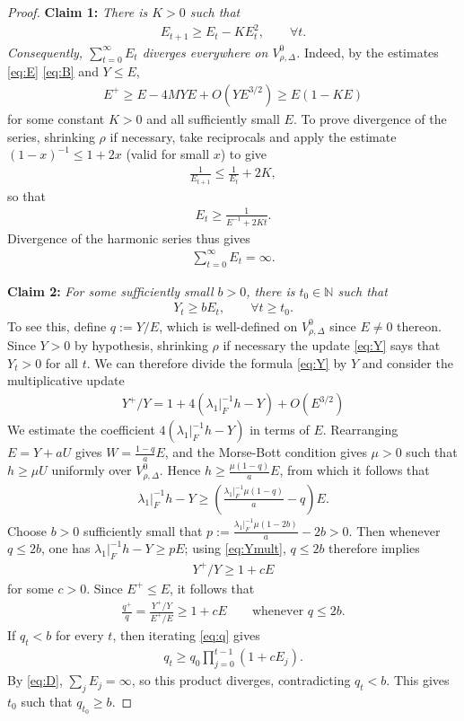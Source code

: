 \documentclass{article}
\newcommand{\NB}{\mathbb{N}}
\theoremstyle{plain}
\theoremstyle{definition}
\theoremstyle{remark}
\begin{document}
\begin{proof}
\noindent\textbf{Claim 1:} \emph{There is $K>0$ such that
\begin{align}
E_{t+1}\ge E_t-KE_t^2,\qquad\forall t.
\end{align}
Consequently, $\sum_{t=0}^{\infty}E_t$ diverges everywhere on $V^0_{\rho,\Delta}$.}
Indeed, by the estimates \eqref{eq:E} \eqref{eq:B} and $Y\le E$,
\begin{align}
E^+\geq E -4MYE+O(YE^{3/2})\geq E(1-KE)
\end{align}
for some constant $K>0$ and all sufficiently small $E$. To prove divergence of the series, shrinking $\rho$ if necessary, take reciprocals and apply the estimate $(1-x)^{-1}\leq 1+2x$ (valid for small $x$) to give
\begin{align}
\frac{1}{E_{t+1}}\leq
\frac{1}{E_t}+2K,
\end{align}
so that
\begin{align}
E_t\ge \frac{1}{E^{-1}+2Kt}.
\end{align}
Divergence of the harmonic series thus gives
\begin{align}\label{eq:D}
\sum_{t=0}^{\infty}E_t=\infty.
\end{align}

\noindent\textbf{Claim 2:}\emph{ For some sufficiently small $b>0$, there is $t_0\in\NB$ such that
\begin{align}
Y_t\ge bE_t,\qquad \forall t\ge t_0.
\end{align}}
To see this, define $q:=Y/E$, which is well-defined on $V^0_{\rho,\Delta}$ since $E\neq 0$ thereon. Since $Y> 0$ by hypothesis, shrinking $\rho$ if necessary the update \eqref{eq:Y} says that $Y_t> 0$ for all $t$. We can therefore divide the formula \eqref{eq:Y} by $Y$ and consider the multiplicative update
\begin{align}\label{eq:Ymult}
Y^+/Y = 1+4(\lambda_1|_F^{-1} h-Y) + O(E^{3/2})
\end{align}
We estimate the coefficient $4(\lambda_1|_F^{-1} h-Y)$ in terms of $E$. Rearranging $E=Y+aU$ gives $W=\frac{1-q}{a}E$, and the Morse-Bott condition gives $\mu>0$ such that $h\geq \mu U$ uniformly over $V^0_{\rho,\Delta}$. Hence $h\ge \frac{\mu(1-q)}{a}E$, from which it follows that
\begin{align}
\lambda_1|_F^{-1} h-Y\geq(\frac{\lambda_1|_F^{-1}\mu(1-q)}{a}-q)E.
\end{align}
Choose $b>0$ sufficiently small that $p:=\frac{\lambda_1|_F^{-1}\mu(1-2b)}{a}-2b>0$. Then whenever $q\le 2b$, one has $\lambda_1|_F^{-1} h-Y\ge pE$; using \eqref{eq:Ymult}, $q\le 2b$ therefore implies
\begin{align}
Y^+/Y\ge 1+cE
\end{align}
for some $c>0$. Since $E^+\le E$, it follows that
\begin{align}\label{eq:q}
\frac{q^+}{q} = \frac{Y^+/Y}{E^+/E}\geq 1+cE\qquad\text{whenever }q\leq 2b.
\end{align}
If $q_t<b$ for every $t$, then iterating \eqref{eq:q} gives
\begin{align}
q_t\ge q_0\prod_{j=0}^{t-1}(1+cE_j).
\end{align}
By \eqref{eq:D}, $\sum_jE_j=\infty$, so this product diverges, contradicting $q_t<b$. This gives $t_0$ such that $q_{t_0}\geq b$. 


\end{proof}
\end{document}
